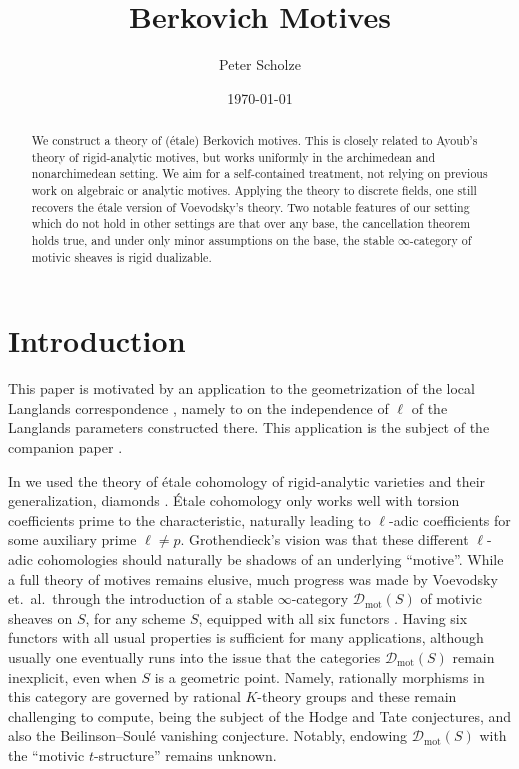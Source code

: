 \documentclass[11pt]{amsart}
\date{\today}
\title{Berkovich Motives}
\author{Peter Scholze}
\numberwithin{equation}{section}
\numberwithin{theorem}{section}
\theoremstyle{definition}
\begin{document}
\begin{abstract} We construct a theory of (\'etale) Berkovich motives. This is closely related to Ayoub's theory of rigid-analytic motives, but works uniformly in the archimedean and nonarchimedean setting. We aim for a self-contained treatment, not relying on previous work on algebraic or analytic motives. Applying the theory to discrete fields, one still recovers the \'etale version of Voevodsky's theory. Two notable features of our setting which do not hold in other settings are that over any base, the cancellation theorem holds true, and under only minor assumptions on the base, the stable $\infty$-category of motivic sheaves is rigid dualizable.
\end{abstract}

\maketitle

\tableofcontents


\section{Introduction}

This paper is motivated by an application to the geometrization of the local Langlands correspondence \cite{FarguesScholze}, namely to \cite[Conjecture I.9.5]{FarguesScholze} on the independence of $\ell$ of the Langlands parameters constructed there. This application is the subject of the companion paper \cite{MotivicGeometrization}.

In \cite{FarguesScholze} we used the theory of \'etale cohomology of rigid-analytic varieties \cite{Huber} and their generalization, diamonds \cite{ECoD}. \'Etale cohomology only works well with torsion coefficients prime to the characteristic, naturally leading to $\ell$-adic coefficients for some auxiliary prime $\ell\neq p$. Grothendieck's vision was that these different $\ell$-adic cohomologies should naturally be shadows of an underlying ``motive''. While a full theory of motives remains elusive, much progress was made by Voevodsky et.~al.~through the introduction of a stable $\infty$-category $\mathcal D_{\mathrm{mot}}(S)$ of motivic sheaves on $S$, for any scheme $S$, equipped with all six functors \cite{AyoubAlgebraic}. Having six functors with all usual properties is sufficient for many applications, although usually one eventually runs into the issue that the categories $\mathcal D_{\mathrm{mot}}(S)$ remain inexplicit, even when $S$ is a geometric point. Namely, rationally morphisms in this category are governed by rational $K$-theory groups and these remain challenging to compute, being the subject of the Hodge and Tate conjectures, and also the Beilinson--Soul\'e vanishing conjecture. Notably, endowing $\mathcal D_{\mathrm{mot}}(S)$ with the ``motivic $t$-structure'' remains unknown.
\end{document}
